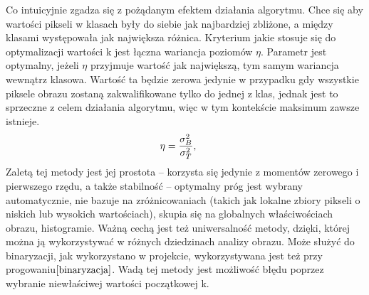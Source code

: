 \documentclass[eng,oneside]{mgr}
\begin{document}
Co intuicyjnie zgadza się z pożądanym efektem działania algorytmu. Chce się aby wartości pikseli w klasach były do siebie jak najbardziej zbliżone, a między klasami występowała jak największa różnica.
Kryterium jakie stosuje się do optymalizacji wartości k jest łączna wariancja poziomów $\eta$. Parametr jest optymalny, jeżeli $\eta$ przyjmuje wartość jak największą, tym samym wariancja wewnątrz klasowa. Wartość ta będzie zerowa jedynie w przypadku gdy wszystkie piksele obrazu zostaną zakwalifikowane tylko do jednej z klas, jednak jest to sprzeczne z celem działania algorytmu, więc w tym kontekście maksimum zawsze istnieje.
\begin{equation}
\eta=\frac{\sigma_B^2}{\sigma_T^2}, \hspace{0.5cm} 
\end{equation}
Zaletą tej metody jest jej prostota – korzysta się jedynie z momentów zerowego i pierwszego rzędu, a także stabilność – optymalny próg jest wybrany automatycznie, nie bazuje na zróżnicowaniach (takich jak lokalne zbiory pikseli o niskich lub wysokich wartościach), skupia się na globalnych właściwościach obrazu, histogramie. Ważną cechą jest też uniwersalność metody, dzięki, której można ją wykorzystywać w różnych dziedzinach analizy obrazu. Może służyć do binaryzacji, jak wykorzystano w projekcie, wykorzystywana jest też przy progowaniu$\cite{binaryzacja}$. Wadą tej metody jest możliwość błędu poprzez wybranie niewłaściwej wartości początkowej k. 
\end{document}
